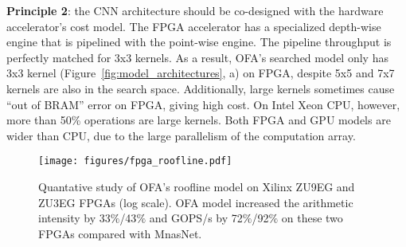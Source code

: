 \documentclass{article} \usepackage{iclr2020_conference,times}
\begin{document}
\textbf{Principle 2}: the CNN architecture should be co-designed with the hardware accelerator's cost model. The FPGA accelerator has a specialized depth-wise engine that is pipelined with the point-wise engine. The pipeline throughput is perfectly matched for 3x3 kernels. As a result, OFA's searched model only has 3x3 kernel (Figure~\ref{fig:model_architectures}, a) on FPGA, despite 5x5 and 7x7 kernels are also in the search space. Additionally, large kernels sometimes cause ``out of BRAM'' error on FPGA, giving high cost. On Intel Xeon CPU, however, more than 50\% operations are large kernels. Both FPGA and GPU models are wider than CPU, due to the large parallelism of the computation array. 





\begin{figure}[t]
    \vspace{-25pt}
    \centering
    \texttt{[image: figures/fpga\_roofline.pdf]}
\caption{Quantative study of OFA's roofline model on Xilinx ZU9EG and ZU3EG FPGAs (log scale). OFA model increased the arithmetic intensity by 33$\%$/43$\%$ and GOPS/s by 72$\%$/92$\%$ on these two FPGAs compared with MnasNet. }
    \vspace{-5pt}
    \label{fig:fpga_roofline}
\end{figure}
\end{document}
